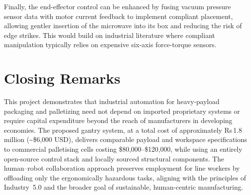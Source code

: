 Finally, the end-effector control can be enhanced by fusing vacuum pressure sensor data with motor current feedback to implement compliant placement, allowing gentler insertion of the microwave into its box and reducing the risk of edge strikes. This would build on industrial literature where compliant manipulation typically relies on expensive six-axis force-torque sensors.


\section{Closing Remarks}

This project demonstrates that industrial automation for heavy-payload packaging and palletizing need not depend on imported proprietary systems or require capital expenditure beyond the reach of manufacturers in developing economies. The proposed gantry system, at a total cost of approximately Rs\,1.8\,million (\textasciitilde\$6,000 USD), delivers comparable payload and workspace specifications to commercial palletising cells costing \$80,000--\$120,000, while using an entirely open-source control stack and locally sourced structural components. The human--robot collaboration approach preserves employment for line workers by offloading only the ergonomically hazardous tasks, aligning with the principles of Industry~5.0 and the broader goal of sustainable, human-centric manufacturing.

